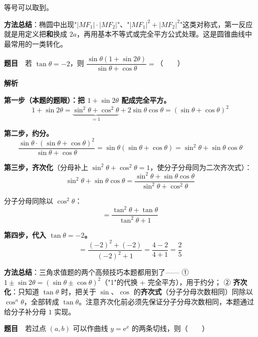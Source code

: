 等号可以取到。


\begin{gktip}
\textbf{方法总结}：椭圆中出现"$\left|MF_1\right|\cdot\left|MF_2\right|$"、"$\left|MF_1\right|^{2}+\left|MF_2\right|^{2}$"这类对称式，第一反应就是用定义把\textbf{和}换成 $2a$，再用基本不等式或完全平方公式处理。这是圆锥曲线中最常用的一类转化。
\end{gktip}

\par\medskip


\textbf{题目}　若 $\tan\theta=-2$，则 $\dfrac{\sin\theta(1+\sin2\theta)}{\sin\theta+\cos\theta}=$（　　）

\textbf{解析}

\textbf{第一步（本题的题眼）：把 $1+\sin2\theta$ 配成完全平方。}
\[1+\sin2\theta=\underbrace{\sin^{2}\theta+\cos^{2}\theta}_{=1}+2\sin\theta\cos\theta=(\sin\theta+\cos\theta)^{2}\]

\textbf{第二步，约分。}
\[\frac{\sin\theta\cdot(\sin\theta+\cos\theta)^{2}}{\sin\theta+\cos\theta}=\sin\theta(\sin\theta+\cos\theta)=\sin^{2}\theta+\sin\theta\cos\theta\]

\textbf{第三步，齐次化}（分母补上 $\sin^{2}\theta+\cos^{2}\theta=1$，使分子分母同为二次齐次式）：
\[\sin^{2}\theta+\sin\theta\cos\theta=\frac{\sin^{2}\theta+\sin\theta\cos\theta}{\sin^{2}\theta+\cos^{2}\theta}\]

分子分母同除以 $\cos^{2}\theta$：
\[=\frac{\tan^{2}\theta+\tan\theta}{\tan^{2}\theta+1}\]

\textbf{第四步，代入 $\tan\theta=-2$。}
\[=\frac{(-2)^{2}+(-2)}{(-2)^{2}+1}=\frac{4-2}{4+1}=\frac25\]


\begin{gktip}
\textbf{方法总结}：三角求值题的两个高频技巧本题都用到了——
① \textbf{$1\pm\sin2\theta=(\sin\theta\pm\cos\theta)^{2}$}（"1"的代换 + 完全平方），用于约分；
② \textbf{齐次化}：只知道 $\tan\theta$ 时，把关于 $\sin$、$\cos$ 的\textbf{齐次式}（分子分母次数相同）同除以 $\cos^{n}\theta$，全部转成 $\tan\theta$。注意齐次化前必须先保证分子分母次数相同，本题通过给分子补分母 $1$ 实现。
\end{gktip}

\par\medskip


\textbf{题目}　若过点 $(a,b)$ 可以作曲线 $y=\mathrm e^{x}$ 的两条切线，则（　　）

